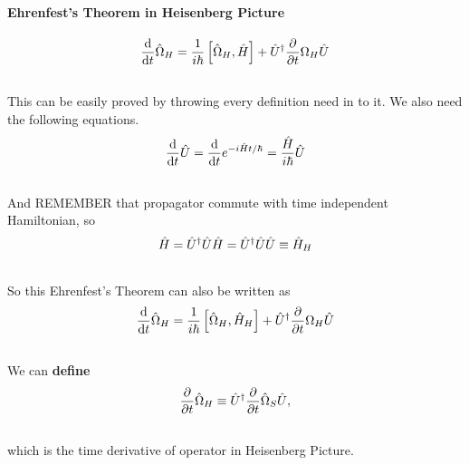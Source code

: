 \documentclass[letterpaper,10pt,english]{sphinxmanual}
\begin{document}
\paragraph{Ehrenfest's Theorem in Heisenberg Picture}
\label{QuantumMechanics:ehrenfest-s-theorem-in-heisenberg-picture}\begin{gather}
\begin{split}\frac{\mathrm{d} }{\mathrm{d} t} \hat \Omega _ H = \frac{1}{i\hbar } \left[ \hat \Omega _ H, \hat H \right] + \hat U ^ \dagger \frac{\partial }{\partial t} \Omega _ H \hat U\end{split}\notag\\\begin{split}\end{split}\notag
\end{gather}
This can be easily proved by throwing every definition need in to it. We also need the following equations.
\begin{gather}
\begin{split}\frac{\mathrm{d} }{\mathrm{d} t} \hat U = \frac{\mathrm{d} }{\mathrm{d} t} e^{-i\hat H t /\hbar} = \frac{\hat H}{i\hbar} \hat U\end{split}\notag\\\begin{split}\end{split}\notag
\end{gather}
And REMEMBER that propagator commute with time independent Hamiltonian, so
\begin{gather}
\begin{split}\hat H = \hat U^\dagger \hat U \hat H = \hat U^ \dagger \hat U \hat U \equiv \hat H _ H\end{split}\notag\\\begin{split}\end{split}\notag
\end{gather}
So this Ehrenfest's Theorem can also be written as
\begin{gather}
\begin{split}\frac{\mathrm{d} }{\mathrm{d} t} \hat \Omega _ H = \frac{1}{i\hbar } \left[ \hat \Omega _ H, \hat H _ H \right] + \hat U ^ \dagger \frac{\partial }{\partial t} \Omega _ H \hat U\end{split}\notag\\\begin{split}\end{split}\notag
\end{gather}
We can \textbf{define}
\begin{gather}
\begin{split}\frac{\partial}{\partial t}\hat  \Omega _ H \equiv \hat U^\dagger  \frac{\partial }{\partial t}\hat  \Omega _ S \hat U  ,\end{split}\notag\\\begin{split}\end{split}\notag
\end{gather}
which is the time derivative of operator in Heisenberg Picture.
\end{document}
